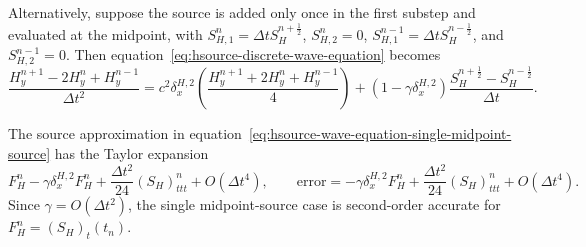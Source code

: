 \documentclass{article}
\numberwithin{figure}{section}
\begin{document}
Alternatively, suppose the source is added only once in the first substep and evaluated at the midpoint, with $S_{H,1}^n=\Delta t S_H^{n+\frac{1}{2}}$, $S_{H,2}^n=0$, $S_{H,1}^{n-1}=\Delta t S_H^{n-\frac{1}{2}}$, and $S_{H,2}^{n-1}=0$. Then equation~\eqref{eq:hsource-discrete-wave-equation} becomes
\begin{equation}
    \frac{H_y^{n+1}-2H_y^n+H_y^{n-1}}{\Delta t^2}=c^2\delta_x^{H,2}\left(\frac{H_y^{n+1}+2H_y^n+H_y^{n-1}}{4}\right)+\left(1-\gamma\delta_x^{H,2}\right)\frac{S_H^{n+\frac{1}{2}}-S_H^{n-\frac{1}{2}}}{\Delta t}. \label{eq:hsource-wave-equation-single-midpoint-source}
\end{equation}

The source approximation in equation~\eqref{eq:hsource-wave-equation-single-midpoint-source} has the Taylor expansion
\begin{equation}
    F_H^n-\gamma\delta_x^{H,2}F_H^n+\frac{\Delta t^2}{24}(S_H)_{ttt}^n+O(\Delta t^4), \qquad \mathrm{error}=-\gamma\delta_x^{H,2}F_H^n+\frac{\Delta t^2}{24}(S_H)_{ttt}^n+O(\Delta t^4). \label{eq:hsource-single-midpoint-source-error}
\end{equation}
Since $\gamma=O(\Delta t^2)$, the single midpoint-source case is second-order accurate for $F_H^n=(S_H)_t(t_n)$.
\end{document}
